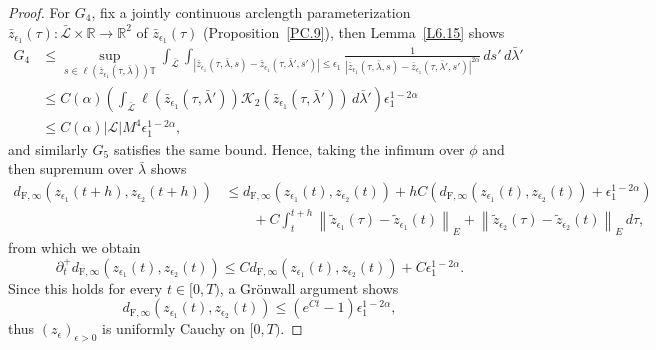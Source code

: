 \documentclass[reqno,centertags,12pt]{amsart}
\theoremstyle{definition}
\numberwithin{equation}{section}
\newcommand{\abs}[1]{\left\lvert#1\right\rvert}
\newcommand{\norm}[1]{\left\|#1\right\|}
\newcommand{\seq}[1]{\left( #1 \right)}
\newcommand{\bbR}{{\mathbb{R}}}
\newcommand{\bbT}{{\mathbb{T}}}
\begin{document}
\begin{proof}
    For $G_{4}$, fix a jointly continuous arclength parameterization
    $\bar{z}_{\epsilon_{1}}(\tau)\colon \bar{\mathcal{L}}\times\bbR\to \bbR^{2}$
    of $\bar{z}_{\epsilon_{1}}(\tau)$ (Proposition~\ref{PC.9}), then
    Lemma~\ref{L6.15} shows
    \begin{align*}
        G_{4} &\leq \sup_{s\in\ell(\bar{z}_{\epsilon_{1}}(\tau,\bar{\lambda}))\bbT}
        \int_{\bar{\mathcal{L}}}
        \int_{\abs{\bar{z}_{\epsilon_{1}}(\tau,\bar{\lambda},s)
        - \bar{z}_{\epsilon_{1}}(\tau,\bar{\lambda}',s')}\leq\epsilon_{1}}
        \frac{1}{\abs{\bar{z}_{\epsilon_{1}}(\tau,\bar{\lambda},s)
        - \bar{z}_{\epsilon_{1}}(\tau,\bar{\lambda}',s')}^{2\alpha}}
        \,ds'\,d\bar{\lambda}' \\
        &\leq C(\alpha)
        \left(\int_{\bar{\mathcal{L}}}\ell(\bar{z}_{\epsilon_{1}}(\tau,\bar{\lambda}'))
        \mathcal{K}_{2}(\bar{z}_{\epsilon_{1}}(\tau,\bar{\lambda}'))
        \,d\bar{\lambda}'\right)\epsilon_{1}^{1-2\alpha} \\
        &\leq C(\alpha)\abs{\mathcal{L}}M^{4}\epsilon_{1}^{1-2\alpha},
    \end{align*}
    and similarly $G_{5}$ satisfies the same bound. Hence, taking the infimum
    over $\phi$ and then supremum over $\bar{\lambda}$ shows
    \begin{align*}
        d_{\mathrm{F},\infty}(z_{\epsilon_{1}}(t+h), z_{\epsilon_{2}}(t+h))
        &\leq 
        d_{\mathrm{F},\infty}(z_{\epsilon_{1}}(t), z_{\epsilon_{2}}(t))
        + hC\left(
            d_{\mathrm{F},\infty}(z_{\epsilon_{1}}(t), z_{\epsilon_{2}}(t))
            + \epsilon_{1}^{1-2\alpha}
        \right)
        \\&\quad\quad
        + C\int_{t}^{t+h}
        \norm{\tilde{z}_{\epsilon_{1}}(\tau) - \tilde{z}_{\epsilon_{1}}(t)}_{E}
        + \norm{\tilde{z}_{\epsilon_{2}}(\tau) - \tilde{z}_{\epsilon_{2}}(t)}_{E}
        \,d\tau,
    \end{align*}
    from which we obtain
    \[
        \partial_{t}^{+}
        d_{\mathrm{F},\infty}(z_{\epsilon_{1}}(t), z_{\epsilon_{2}}(t))
        \leq Cd_{\mathrm{F},\infty}(z_{\epsilon_{1}}(t), z_{\epsilon_{2}}(t))
        +C\epsilon_{1}^{1-2\alpha}.
    \]
    Since this holds for every $t\in[0,T)$, a Gr\"{o}nwall argument shows
    \[
        d_{\mathrm{F},\infty}(z_{\epsilon_{1}}(t), z_{\epsilon_{2}}(t))
        \leq (e^{Ct} - 1)\epsilon_{1}^{1-2\alpha},
    \]
    thus $\seq{z_{\epsilon}}_{\epsilon>0}$ is uniformly Cauchy on
    $[0,T)$.
\end{proof}
\end{document}
